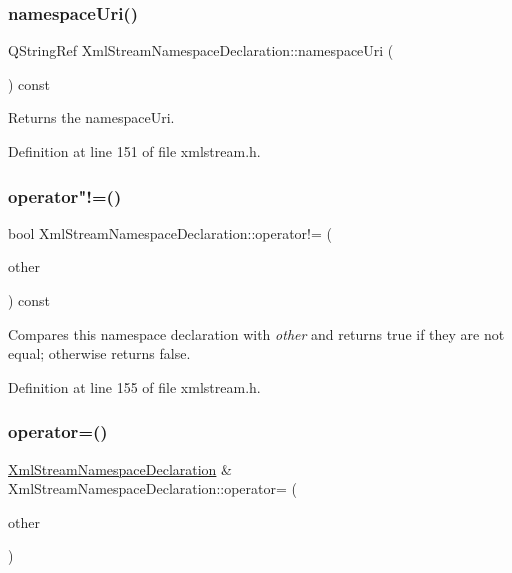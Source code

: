 \subsubsection{\texorpdfstring{namespace\+Uri()}{namespaceUri()}}
{\footnotesize\ttfamily Q\+String\+Ref Xml\+Stream\+Namespace\+Declaration\+::namespace\+Uri (\begin{DoxyParamCaption}{ }\end{DoxyParamCaption}) const\hspace{0.3cm}{\ttfamily [inline]}}

Returns the namespace\+Uri. 

Definition at line 151 of file xmlstream.\+h.

\mbox{\label{class_xml_stream_namespace_declaration_a44ed88502e624652408d781118835295}} 
\subsubsection{\texorpdfstring{operator"!=()}{operator!=()}}
{\footnotesize\ttfamily bool Xml\+Stream\+Namespace\+Declaration\+::operator!= (\begin{DoxyParamCaption}\item[{const \hyperlink{class_xml_stream_namespace_declaration}{Xml\+Stream\+Namespace\+Declaration} \&}]{other }\end{DoxyParamCaption}) const\hspace{0.3cm}{\ttfamily [inline]}}

Compares this namespace declaration with {\itshape other} and returns {\ttfamily true} if they are not equal; otherwise returns {\ttfamily false}. 

Definition at line 155 of file xmlstream.\+h.

\mbox{\label{class_xml_stream_namespace_declaration_a554efdcdfc87142180db128f9c8c0ed7}} 
\subsubsection{\texorpdfstring{operator=()}{operator=()}}
{\footnotesize\ttfamily \hyperlink{class_xml_stream_namespace_declaration}{Xml\+Stream\+Namespace\+Declaration} \& Xml\+Stream\+Namespace\+Declaration\+::operator= (\begin{DoxyParamCaption}\item[{const \hyperlink{class_xml_stream_namespace_declaration}{Xml\+Stream\+Namespace\+Declaration} \&}]{other }\end{DoxyParamCaption})}

